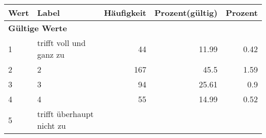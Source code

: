      \begin{longtable}{lXrrr}
     \toprule
     \textbf{Wert} & \textbf{Label} & \textbf{Häufigkeit} & \textbf{Prozent(gültig)} & \textbf{Prozent} \\
     \endhead
     \midrule
     \multicolumn{5}{l}{\textbf{Gültige Werte}}\\

     1 &
     \multicolumn{1}{X}{ trifft voll und ganz zu   } &


       \num{44} &
       \num[round-mode=places,round-precision=2]{11.99} &
         \num[round-mode=places,round-precision=2]{0.42} \\

     2 &
     \multicolumn{1}{X}{ 2   } &


       \num{167} &
       \num[round-mode=places,round-precision=2]{45.5} &
         \num[round-mode=places,round-precision=2]{1.59} \\

     3 &
     \multicolumn{1}{X}{ 3   } &


       \num{94} &
       \num[round-mode=places,round-precision=2]{25.61} &
         \num[round-mode=places,round-precision=2]{0.9} \\

     4 &
     \multicolumn{1}{X}{ 4   } &


       \num{55} &
       \num[round-mode=places,round-precision=2]{14.99} &
         \num[round-mode=places,round-precision=2]{0.52} \\

     5 &
     \multicolumn{1}{X}{ trifft überhaupt nicht zu   } &



\end{longtable}
